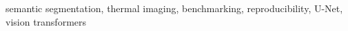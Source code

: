 \documentclass[conference]{IEEEtran}
\begin{document}
\begin{IEEEkeywords}
semantic segmentation, thermal imaging, benchmarking, reproducibility, U-Net, vision transformers
\end{IEEEkeywords}















\end{document}
